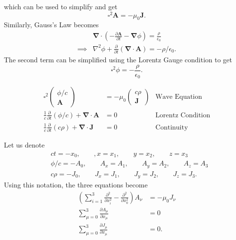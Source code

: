 \documentclass{article}
\numberwithin{equation}{section}
\begin{document}
which can be used to simplify and get 
\begin{equation}
    \boxed{\square^2 \bm{A} = -\mu_0 \bm{J}.}
\end{equation}
Similarly, Gauss's Law becomes 
\begin{align}
    &\bm{\nabla}\cdot \left(-\frac{\partial \bm{A}}{\partial t} - \bm{\nabla}\phi\right) = \frac{\rho}{\epsilon_0} \\ 
    \implies & \nabla^2 \phi + \frac{\partial}{\partial t}(\bm{\nabla}\cdot \bm{A}) = - \rho/\epsilon_0.
\end{align}
The second term can be simplified using the Lorentz Gauge condition to get 
\begin{equation}
    \boxed{\square^2\phi = -\frac{\rho}{\epsilon_0}.}
\end{equation}
\begin{summary}
    \begin{align}
        \square^2 \begin{pmatrix}
            \phi/c \\ \bm{A}
        \end{pmatrix} &= -\mu_0\begin{pmatrix}
            c\rho \\ \bm{J}
        \end{pmatrix} & \text{Wave Equation}\\ 
        \frac{1}{c}\frac{\partial}{\partial t}\left(\phi/c\right) + \bm{\nabla}\cdot \bm{A} &= 0 & \text{Lorentz Condition}\\ 
        \frac{1}{c}\frac{\partial}{\partial t}(c\rho) + \bm{\nabla}\cdot \bm{J} &= 0 & \text{Continuity}
    \end{align}
\end{summary}
Let us denote
\begin{align}
    &ct =-x_0,\quad\quad, x=x_1,\quad\quad y=x_2,\quad\quad z=x_3 \\ 
    &\phi/c = -A_0,\quad\quad A_x=A_1,\quad\quad A_y=A_2,\quad\quad A_z=A_3 \\ 
    & c\rho = -J_0,\quad\quad J_x=J_1,\quad\quad J_y=J_2,\quad\quad J_z=J_3.
\end{align}
Using this notation, the three equations become 
\begin{align}
    \left(\sum_{i=1}^{3} \frac{\partial^2}{\partial x_i^2} - \frac{\partial^2}{\partial x_0^2}\right)A_\nu &= -\mu_0 J_{\nu} \\ 
    \sum_{\mu=0}^{3} \frac{\partial A_{\mu}}{\partial x_{\mu}} &= 0 \\ 
    \sum_{\mu=0}^{3} \frac{\partial J_{\mu}}{\partial x_{\mu}} &= 0.
\end{align}
\end{document}
